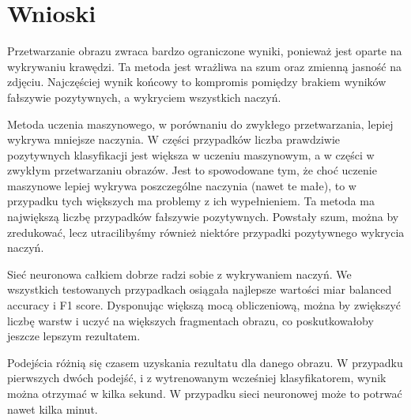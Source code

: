 \documentclass[polish,polish,a4paper]{article}
\begin{document}





	
	\section{Wnioski}
	
	 Przetwarzanie obrazu zwraca bardzo ograniczone wyniki,
	 ponieważ jest oparte na wykrywaniu krawędzi.
	 Ta metoda jest wrażliwa na szum oraz zmienną jasność na zdjęciu.
	 Najczęściej wynik końcowy to kompromis
	 pomiędzy brakiem wyników fałszywie pozytywnych, 
	 a wykryciem wszystkich naczyń.
	 
	 Metoda uczenia maszynowego, 
	 w porównaniu do zwykłego przetwarzania, 
	 lepiej wykrywa mniejsze naczynia.
	 W części przypadków liczba prawdziwie pozytywnych klasyfikacji jest większa w uczeniu maszynowym, 
	 a w części w zwykłym  przetwarzaniu obrazów.
	 Jest to spowodowane tym, 
	 że choć uczenie maszynowe lepiej wykrywa poszczególne naczynia (nawet te małe),
	 to w przypadku tych większych ma problemy z ich wypełnieniem.
	 Ta metoda ma największą liczbę przypadków fałszywie pozytywnych.
	 Powstały szum, można by zredukować, 
	 lecz utracilibyśmy również niektóre przypadki pozytywnego wykrycia naczyń.
	
	Sieć neuronowa całkiem dobrze radzi sobie z wykrywaniem naczyń.
	We wszystkich testowanych przypadkach osiągała najlepsze
	wartości miar balanced accuracy i F1 score.
	Dysponując większą mocą obliczeniową,
	można by zwiększyć liczbę warstw i uczyć na większych fragmentach obrazu,
	co poskutkowałoby jeszcze lepszym rezultatem.
	
	Podejścia różnią się czasem uzyskania rezultatu dla danego obrazu.
	W przypadku pierwszych dwóch podejść, i z wytrenowanym wcześniej klasyfikatorem,
	wynik można otrzymać w kilka sekund.
	W przypadku sieci neuronowej może to potrwać nawet kilka minut.
		
\end{document}
